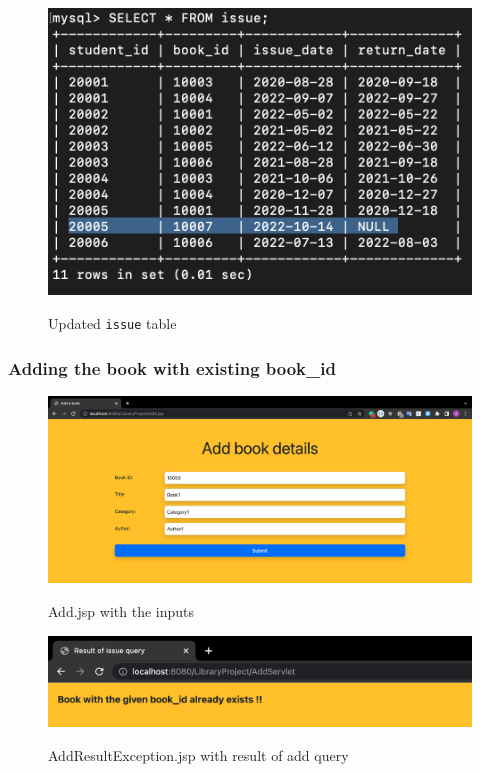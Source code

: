 \documentclass[12pt]{article}
\let\oldtexttt\texttt
\renewcommand{\texttt}[1]{
  \colorbox{bgcolor}{\oldtexttt{#1}}
  }
\begin{document}
\begin{figure}[!hbt]
    \centering
    \includegraphics[scale=0.56]{screenshots/b3_11.png}
    \label{fig:my_label1}
    \caption{Updated \oldtexttt{issue} table}
\end{figure}

\newpage

\subsubsection{Adding the book with existing book\_id}

\begin{figure}[!hbt]
    \centering
    \includegraphics[scale=0.34]{screenshots/b3_12.png}
    \label{fig:my_label1}
    \caption{Add.jsp with the inputs}
\end{figure}
\vspace{2cm}
\begin{figure}[!hbt]
    \centering
    \includegraphics[scale=0.69]{screenshots/b3_13.png}
    \label{fig:my_label1}
    \caption{AddResultException.jsp with result of add query}
\end{figure}
\end{document}
